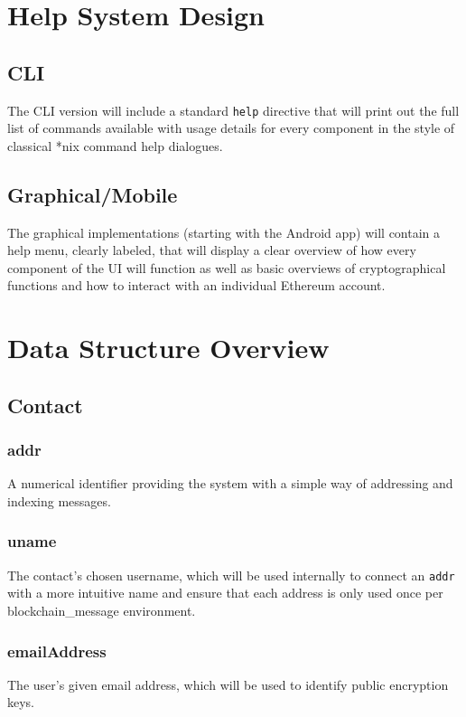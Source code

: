 \documentclass[titlepage]{report}
\begin{document}
\section{Help System Design}

\subsection{CLI}
The CLI version will include a standard \verb|help| directive that will print out the full list of commands available with usage details for every component in the style of classical *nix command help dialogues.

\subsection{Graphical/Mobile}
The graphical implementations (starting with the Android app) will contain a help menu, clearly labeled, that will display a clear overview of how every component of the UI will function as well as basic overviews of cryptographical functions and how to interact with an individual Ethereum account.

\section{Data Structure Overview}
\subsection{Contact}
\subsubsection{addr}
A numerical identifier providing the system with a simple way of addressing and indexing messages.

\subsubsection{uname}
The contact's chosen username, which will be used internally to connect an \texttt{addr} with a more intuitive name and ensure that each address is only used once per blockchain\_message environment.

\subsubsection{emailAddress}
The user's given email address, which will be used to identify public encryption keys.
\end{document}
